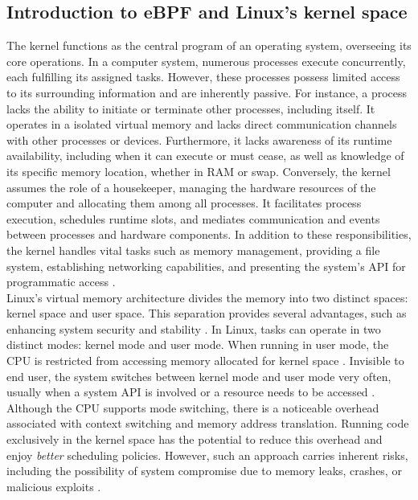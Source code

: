 \subsection{Introduction to eBPF and Linux's kernel space}
The kernel functions as the central program of an operating system, overseeing its core operations. 
In a computer system, numerous processes execute concurrently, each fulfilling its assigned tasks. 
However, these processes possess limited access to its surrounding information and are inherently passive.
For instance, a process lacks the ability to initiate or terminate other processes, including itself. 
It operates in a isolated virtual memory and lacks direct communication channels with other processes or devices. 
Furthermore, it lacks awareness of its runtime availability, including when it can execute or must cease, as well as knowledge of its specific memory location, whether in RAM or swap.
Conversely, the kernel assumes the role of a housekeeper, managing the hardware resources of the computer and allocating them among all processes. It facilitates process execution, schedules runtime slots, and mediates communication and events between processes and hardware components.
In addition to these responsibilities, the kernel handles vital tasks such as memory management, providing a file system, establishing networking capabilities, and presenting the system's \ac{API} for programmatic access \cite{kerrisk_linux_2010}.
\\

Linux's virtual memory architecture divides the memory into two distinct spaces: kernel space and user space. This separation provides several advantages, such as enhancing system security and stability \cite{understanding_the_linux_kernel_bovet_cassetti}.
In Linux, tasks can operate in two distinct modes: kernel mode and user mode. When running in user mode, the CPU is restricted from accessing memory allocated for kernel space \cite{kerrisk_linux_2010}.
Invisible to end user, the system switches between kernel mode and user mode very often, usually when a system \ac{API} is involved or a resource needs to be accessed \cite{Robert_linux_kernel_dev}.
Although the CPU supports mode switching, there is a noticeable overhead associated with context switching and memory address translation. 
Running code exclusively in the kernel space has the potential to reduce this overhead and enjoy \textit{better} scheduling policies. 
However, such an approach carries inherent risks, including the possibility of system compromise due to memory leaks, crashes, or malicious exploits \cite{lwn_detect_kernel_mem_leak} \cite{emamdoost_detecting_2021}.
\\

